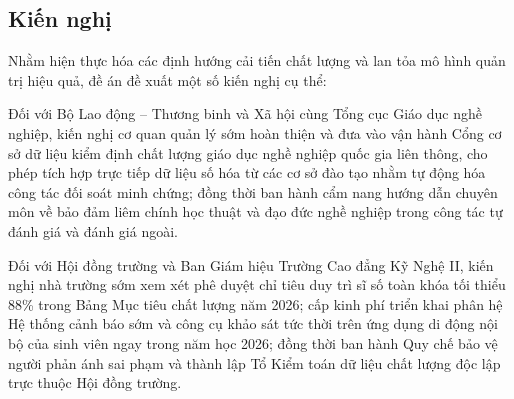 \subsection{Kiến nghị}

Nhằm hiện thực hóa các định hướng cải tiến chất lượng và lan tỏa mô hình quản trị hiệu quả, đề án đề xuất một số kiến nghị cụ thể:

Đối với Bộ Lao động -- Thương binh và Xã hội cùng Tổng cục Giáo dục nghề nghiệp, kiến nghị cơ quan quản lý sớm hoàn thiện và đưa vào vận hành Cổng cơ sở dữ liệu kiểm định chất lượng giáo dục nghề nghiệp quốc gia liên thông, cho phép tích hợp trực tiếp dữ liệu số hóa từ các cơ sở đào tạo nhằm tự động hóa công tác đối soát minh chứng; đồng thời ban hành cẩm nang hướng dẫn chuyên môn về bảo đảm liêm chính học thuật và đạo đức nghề nghiệp trong công tác tự đánh giá và đánh giá ngoài.

Đối với Hội đồng trường và Ban Giám hiệu Trường Cao đẳng Kỹ Nghệ II, kiến nghị nhà trường sớm xem xét phê duyệt chỉ tiêu duy trì sĩ số toàn khóa tối thiểu 88\% trong Bảng Mục tiêu chất lượng năm 2026; cấp kinh phí triển khai phân hệ Hệ thống cảnh báo sớm và công cụ khảo sát tức thời trên ứng dụng di động nội bộ của sinh viên ngay trong năm học 2026; đồng thời ban hành Quy chế bảo vệ người phản ánh sai phạm và thành lập Tổ Kiểm toán dữ liệu chất lượng độc lập trực thuộc Hội đồng trường.
